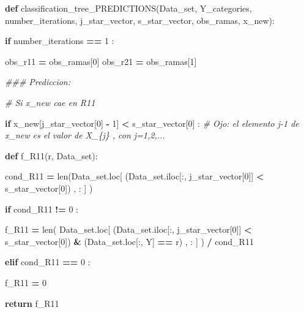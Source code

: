 \documentclass[
  11pt,
  a4paper,
]{article}
\newenvironment{Shaded}{\begin{snugshade}}{\end{snugshade}}
\newcommand{\BuiltInTok}[1]{#1}
\newcommand{\CommentTok}[1]{\textcolor[rgb]{0.56,0.35,0.01}{\textit{#1}}}
\newcommand{\ControlFlowTok}[1]{\textcolor[rgb]{0.13,0.29,0.53}{\textbf{#1}}}
\newcommand{\DecValTok}[1]{\textcolor[rgb]{0.00,0.00,0.81}{#1}}
\newcommand{\KeywordTok}[1]{\textcolor[rgb]{0.13,0.29,0.53}{\textbf{#1}}}
\newcommand{\NormalTok}[1]{#1}
\newcommand{\OperatorTok}[1]{\textcolor[rgb]{0.81,0.36,0.00}{\textbf{#1}}}
\newcommand{\StringTok}[1]{\textcolor[rgb]{0.31,0.60,0.02}{#1}}
\begin{document}
\begin{Shaded}
\begin{Highlighting}[]
\KeywordTok{def}\NormalTok{ classification\_tree\_PREDICTIONS(Data\_set, Y\_categories, number\_iterations, j\_star\_vector, s\_star\_vector, obs\_ramas, x\_new):}

    \ControlFlowTok{if}\NormalTok{ number\_iterations }\OperatorTok{==} \DecValTok{1}\NormalTok{ :}

\NormalTok{            obs\_r11 }\OperatorTok{=}\NormalTok{ obs\_ramas[}\DecValTok{0}\NormalTok{]}
\NormalTok{            obs\_r21 }\OperatorTok{=}\NormalTok{ obs\_ramas[}\DecValTok{1}\NormalTok{]}


        \CommentTok{\#\#\# Prediccion:}

            \CommentTok{\# Si x\_new cae en R11 }

            \ControlFlowTok{if}\NormalTok{ x\_new[j\_star\_vector[}\DecValTok{0}\NormalTok{] }\OperatorTok{{-}} \DecValTok{1}\NormalTok{] }\OperatorTok{\textless{}}\NormalTok{ s\_star\_vector[}\DecValTok{0}\NormalTok{] :  }\CommentTok{\# Ojo: el elemento j{-}1 de x\_new es el valor de X\_\{j\} , con j=1,2,...}

                
                \KeywordTok{def}\NormalTok{ f\_R11(r, Data\_set):}

\NormalTok{                    cond\_R11 }\OperatorTok{=} \BuiltInTok{len}\NormalTok{(Data\_set.loc[ (Data\_set.iloc[:, j\_star\_vector[}\DecValTok{0}\NormalTok{]] }\OperatorTok{\textless{}}\NormalTok{ s\_star\_vector[}\DecValTok{0}\NormalTok{]) , : ] )}

                    \ControlFlowTok{if}\NormalTok{  cond\_R11 }\OperatorTok{!=} \DecValTok{0}\NormalTok{ :}

\NormalTok{                        f\_R11 }\OperatorTok{=} \BuiltInTok{len}\NormalTok{( Data\_set.loc[  (Data\_set.iloc[:, j\_star\_vector[}\DecValTok{0}\NormalTok{]] }\OperatorTok{\textless{}}\NormalTok{ s\_star\_vector[}\DecValTok{0}\NormalTok{]) }\OperatorTok{\&}\NormalTok{ (Data\_set.loc[:, }\StringTok{\textquotesingle{}Y\textquotesingle{}}\NormalTok{] }\OperatorTok{==}\NormalTok{ r) , : ] ) }\OperatorTok{/}\NormalTok{ cond\_R11}

            
                    \ControlFlowTok{elif}\NormalTok{ cond\_R11 }\OperatorTok{==} \DecValTok{0}\NormalTok{ :}

\NormalTok{                        f\_R11 }\OperatorTok{=} \DecValTok{0}
 
            
                    \ControlFlowTok{return}\NormalTok{ f\_R11}
                



\end{Highlighting}
\end{Shaded}
\end{document}
